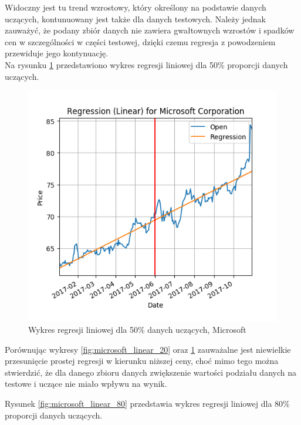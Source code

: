 Widoczny jest tu trend wzrostowy, który określony na podstawie danych uczących, kontunuowany jest także dla danych testowych.
Należy jednak zauważyć, że podany zbiór danych nie zawiera gwałtownych wzrostów i spadków cen w szczególności w części testowej, dzięki czemu regresja z powodzeniem przewiduje jego kontynuację.\\

Na rysunku \ref{fig:microsoft_linear_50} przedstawiono wykres regresji liniowej dla 50\% proporcji danych uczących.
\begin{figure}[h!]
\centering
\includegraphics[width=150mm]{pictures/plots/microsoft_linear_50.png}
\caption{Wykres regresji liniowej dla 50\% danych uczących, Microsoft}
\label{fig:microsoft_linear_50}
\end{figure}

Porównując wykresy \ref{fig:microsoft_linear_20} oraz \ref{fig:microsoft_linear_50} zauważalne jest niewielkie przesunięcie prostej regresji w kierunku niższej ceny, 
choć mimo tego można stwierdzić, że dla danego zbioru danych zwiększenie wartości podziału danych na testowe i uczące nie miało wpływu na wynik.

Rysunek \ref{fig:microsoft_linear_80} przedstawia wykres regresji liniowej dla 80\% proporcji danych uczących.\\

